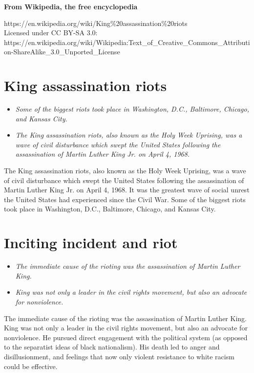 \textbf{From Wikipedia, the free encyclopedia}

https://en.wikipedia.org/wiki/King\%20assassination\%20riots\\
Licensed under CC BY-SA 3.0:\\
https://en.wikipedia.org/wiki/Wikipedia:Text\_of\_Creative\_Commons\_Attribution-ShareAlike\_3.0\_Unported\_License

\section{King assassination riots}\label{king-assassination-riots}

\begin{itemize}
\item
  \emph{Some of the biggest riots took place in Washington, D.C.,
  Baltimore, Chicago, and Kansas City.}
\item
  \emph{The King assassination riots, also known as the Holy Week
  Uprising, was a wave of civil disturbance which swept the United
  States following the assassination of Martin Luther King Jr. on April
  4, 1968.}
\end{itemize}

The King assassination riots, also known as the Holy Week Uprising, was
a wave of civil disturbance which swept the United States following the
assassination of Martin Luther King Jr. on April 4, 1968. It was the
greatest wave of social unrest the United States had experienced since
the Civil War. Some of the biggest riots took place in Washington, D.C.,
Baltimore, Chicago, and Kansas City.

\section{Inciting incident and riot}\label{inciting-incident-and-riot}

\begin{itemize}
\item
  \emph{The immediate cause of the rioting was the assassination of
  Martin Luther King.}
\item
  \emph{King was not only a leader in the civil rights movement, but
  also an advocate for nonviolence.}
\end{itemize}

The immediate cause of the rioting was the assassination of Martin
Luther King. King was not only a leader in the civil rights movement,
but also an advocate for nonviolence. He pursued direct engagement with
the political system (as opposed to the separatist ideas of black
nationalism). His death led to anger and disillusionment, and feelings
that now only violent resistance to white racism could be effective.


